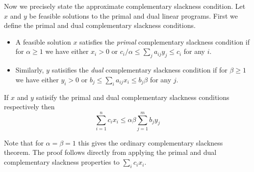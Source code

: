 Now we precisely state the approximate complementary slackness condition.
Let $x$ and $y$ be feasible solutions to the primal and dual linear programs.
First we define the primal and dual complementary slackness conditions.
\begin{itemize}
\item A feasible solution $x$ satisfies the \emph{primal} complementary slackness condition if for $\alpha \geq 1$ we have either $x_i > 0$ or $c_i / \alpha \leq \sum_j a_{ij} y_j \leq c_i$ for any $i$.
\item Similarly, $y$ satisifies the \emph{dual} complementary slackness condition if for $\beta \geq 1$ we have either $y_i > 0$ or $b_j \leq \sum_i a_{ij} x_i \leq b_j \beta$ for any $j$.
\end{itemize}

If $x$ and $y$ satisify the primal and dual complementary slackness conditions respectively then 
\[
\sum_{i=1}^n c_i x_i  \leq \alpha \beta  \sum_{j=1}^m b_j y_j
\]

Note that for $\alpha = \beta = 1$ this gives the ordinary complementary slackness theorem.
The proof follows directly from applying the primal and dual complementary slackness properties to $\sum_i c_i x_i$.
